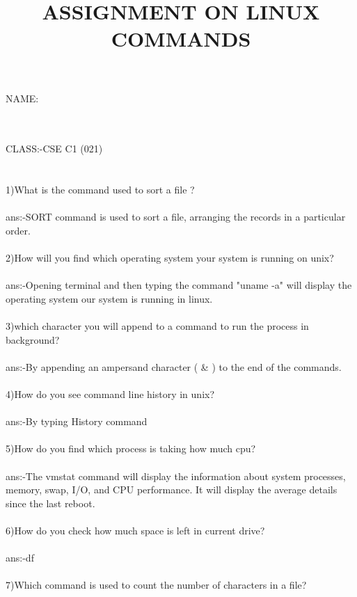 \documentclass{article}
\begin{document}
\title{ASSIGNMENT ON LINUX COMMANDS}

\maketitle

\Large NAME: \author {\Large \color {purple}{A.Saikiran , ID : B192662}}
\\ \\
CLASS:-CSE C1 (021)\\ \\
\Large{
\\1)What is the command used to sort a file ?\\ \\
ans:-SORT command is used to sort a file, arranging the records in a particular order.\\ \\
2)How will you find which operating system your system is running on unix?\\ \\
ans:-Opening terminal and then typing the command "uname -a" will display the operating system
our system is running in linux.\\ \\
3)which character you will append to a command to run the process in background?\\ \\
ans:-By appending an ampersand character ( & ) to the end of the commands.\\ \\
4)How do you see command line history in unix?\\ \\
ans:-By typing History command\\ \\
5)How do you find which process is taking how much cpu?\\ \\
ans:-The vmstat command will display the information about system processes, memory, swap, I/O,
and CPU performance. It will display the average details since the last reboot.\\ \\
6)How do you check how much space is left in current drive?\\ \\
ans:-df\\ \\
7)Which command is used to count the number of characters in a file?\\ \\
}
\end{document}
